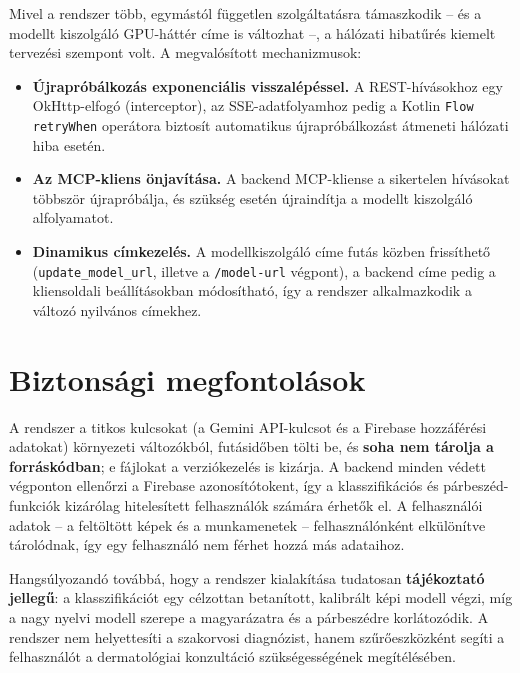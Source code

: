 Mivel a rendszer több, egymástól független szolgáltatásra támaszkodik -- és a
modellt kiszolgáló GPU-háttér címe is változhat --, a hálózati hibatűrés
kiemelt tervezési szempont volt. A megvalósított mechanizmusok:

\begin{itemize}
  \item \textbf{Újrapróbálkozás exponenciális visszalépéssel.} A REST-hívásokhoz
  egy OkHttp-elfogó (interceptor), az SSE-adatfolyamhoz pedig a Kotlin
  \texttt{Flow} \texttt{retryWhen} operátora biztosít automatikus
  újrapróbálkozást átmeneti hálózati hiba esetén.
  \item \textbf{Az MCP-kliens önjavítása.} A backend MCP-kliense a sikertelen
  hívásokat többször újrapróbálja, és szükség esetén újraindítja a modellt
  kiszolgáló alfolyamatot.
  \item \textbf{Dinamikus címkezelés.} A modellkiszolgáló címe futás közben
  frissíthető (\texttt{update\_model\_url}, illetve a \texttt{/model-url}
  végpont), a backend címe pedig a kliensoldali beállításokban módosítható, így
  a rendszer alkalmazkodik a változó nyilvános címekhez.
\end{itemize}

\section{Biztonsági megfontolások}

A rendszer a titkos kulcsokat (a Gemini API-kulcsot és a Firebase hozzáférési
adatokat) környezeti változókból, futásidőben tölti be, és \textbf{soha nem
tárolja a forráskódban}; e fájlokat a verziókezelés is kizárja. A backend minden
védett végponton ellenőrzi a Firebase azonosítótokent, így a klasszifikációs és
párbeszéd-funkciók kizárólag hitelesített felhasználók számára érhetők el. A
felhasználói adatok -- a feltöltött képek és a munkamenetek -- felhasználónként
elkülönítve tárolódnak, így egy felhasználó nem férhet hozzá más adataihoz.

Hangsúlyozandó továbbá, hogy a rendszer kialakítása tudatosan
\textbf{tájékoztató jellegű}: a klasszifikációt egy célzottan betanított,
kalibrált képi modell végzi, míg a nagy nyelvi modell szerepe a magyarázatra és a
párbeszédre korlátozódik. A rendszer nem helyettesíti a szakorvosi diagnózist,
hanem szűrőeszközként segíti a felhasználót a dermatológiai konzultáció
szükségességének megítélésében.
